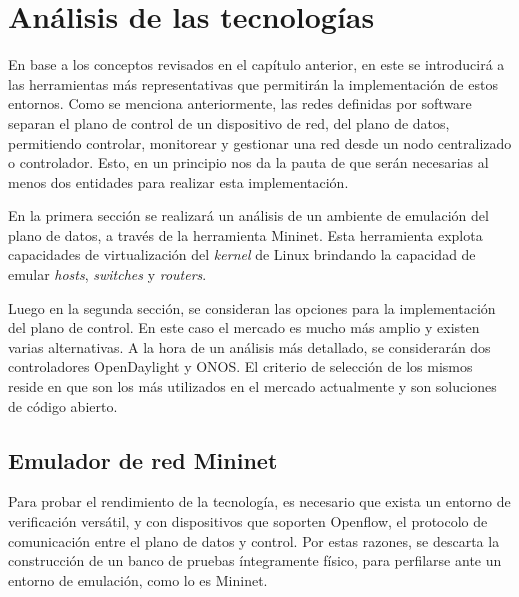  
\chapter{Análisis de las tecnologías} %

\label{Chapter3} %

En base a los conceptos revisados en el capítulo anterior, en este se introducirá a las herramientas más representativas que permitirán la implementación de estos entornos. Como se menciona anteriormente, las redes definidas por software separan el plano de control de un dispositivo de red, del plano de datos, permitiendo controlar, monitorear y gestionar una red desde un nodo centralizado o controlador. Esto, en un principio nos da la pauta de que serán necesarias al menos dos entidades para realizar esta implementación.

En la primera sección se realizará un análisis de un ambiente de emulación del plano de datos, a través de la herramienta Mininet. Esta herramienta explota capacidades de virtualización del \textit{kernel} de Linux brindando la capacidad de emular \textit{hosts}, \textit{switches} y \textit{routers}.

Luego en la segunda sección, se consideran las opciones para la implementación del plano de control. En este caso el mercado es mucho más amplio y existen varias alternativas. A la hora de un análisis más detallado, se considerarán dos controladores OpenDaylight y ONOS. El criterio de selección de los mismos reside en que son los más utilizados en el mercado actualmente y son soluciones de código abierto.


\section{Emulador de red Mininet}

Para probar el rendimiento de la tecnología, es necesario que exista un entorno de verificación versátil, y con dispositivos que soporten Openflow, el protocolo de comunicación entre el plano de datos y control. Por estas razones, se descarta la construcción de un banco de pruebas íntegramente físico, para perfilarse ante un entorno de emulación, como lo es Mininet.

